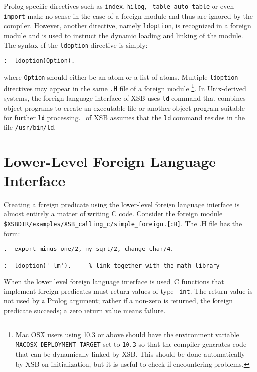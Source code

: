 Prolog-specific directives such as {\tt index}, {\tt hilog}, {\tt
  table}, {\tt auto\_table} or even {\tt import} make no sense in the
case of a foreign module and thus are ignored by the compiler.
However, another directive, namely {\tt ldoption}, is recognized in a
foreign module and is used to instruct the dynamic loading and linking
of the module.  The syntax of the {\tt ldoption} directive is simply:
\begin{center}
{\tt  :- ldoption(Option).    }
\end{center}
where {\tt Option} should either be an atom or a list of atoms.
Multiple {\tt ldoption} directives may appear in the same {\tt .H}
file of a foreign module \footnote{Mac OSX users using 10.3 or above
  should have the environment variable {\tt
    MACOSX\_DEPLOYMENT\_TARGET} set to {\tt 10.3} so that the compiler
  generates code that can be dynamically linked by XSB.  This should
  be done automatically by XSB on initialization, but it is useful to
  check if encountering problems.}.
In Unix-derived systems, the foreign language interface of XSB uses
{\tt ld} command that combines object programs to create an executable
file or another object program suitable for further {\tt ld}
processing. \version\ of XSB assumes that the {\tt ld} command resides
in the file {\tt /usr/bin/ld}.

\section{Lower-Level Foreign Language Interface}

Creating a foreign predicate using the lower-level foreign language
interface is almost entirely a matter of writing C code.  Consider the
foreign module {\tt
  \$XSBDIR/examples/XSB\_calling\_c/simple\_foreign.[cH]}.  The .H file
has the form: 

\begin{verbatim}
:- export minus_one/2, my_sqrt/2, change_char/4.

:- ldoption('-lm').     % link together with the math library
\end{verbatim}

When the lower level foreign language interface is used, C functions
that implement foreign predicates must return values of type {\tt
  int}.  The return value is not used by a Prolog argument; rather if
a non-zero is returned, the foreign predicate succeeds; a zero return
value means failure.

